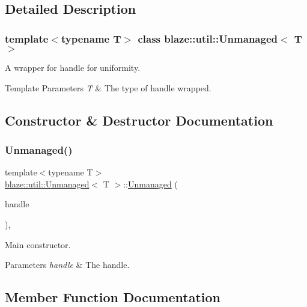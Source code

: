 \subsection{Detailed Description}
\subsubsection*{template$<$typename T$>$\newline
class blaze\+::util\+::\+Unmanaged$<$ T $>$}

A wrapper for handle for uniformity. 


\begin{DoxyTemplParams}{Template Parameters}
{\em T} & The type of handle wrapped. \\
\hline
\end{DoxyTemplParams}


\subsection{Constructor \& Destructor Documentation}
\mbox{\label{classblaze_1_1util_1_1Unmanaged_a1cd09eebfad8e92f75798127fb783f9d}} 
\subsubsection{\texorpdfstring{Unmanaged()}{Unmanaged()}}
{\footnotesize\ttfamily template$<$typename T$>$ \\
\hyperlink{classblaze_1_1util_1_1Unmanaged}{blaze\+::util\+::\+Unmanaged}$<$ T $>$\+::\hyperlink{classblaze_1_1util_1_1Unmanaged}{Unmanaged} (\begin{DoxyParamCaption}\item[{T}]{handle }\end{DoxyParamCaption})\hspace{0.3cm}{\ttfamily [inline]}, {\ttfamily [noexcept]}}



Main constructor. 


\begin{DoxyParams}{Parameters}
{\em handle} & The handle. \\
\hline
\end{DoxyParams}


\subsection{Member Function Documentation}
\mbox{\label{classblaze_1_1util_1_1Unmanaged_a945a30c97396b358cf250025520e9dbc}} 
